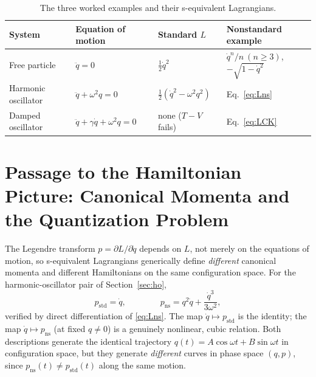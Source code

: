 \documentclass[11pt]{article}
\theoremstyle{remark}
\begin{document}
\begin{table}[h]
\centering
\renewcommand{\arraystretch}{1.4}
\begin{tabular}{l l l l}
\hline
System & Equation of motion & Standard $L$ & Nonstandard example \\
\hline
Free particle & $\ddot q=0$ & $\tfrac12\dot q^2$ & $\dot q^n/n\ (n\geq 3)$, $-\sqrt{1-\dot q^2}$ \\
Harmonic oscillator & $\ddot q+\omega^2 q=0$ & $\tfrac12(\dot q^2-\omega^2 q^2)$ & Eq.~\eqref{eq:Lns} \\
Damped oscillator & $\ddot q+\gamma\dot q+\omega^2 q=0$ & none ($T{-}V$ fails) & Eq.~\eqref{eq:LCK} \\
\hline
\end{tabular}
\caption{The three worked examples and their s-equivalent Lagrangians.}
\label{tab:summary}
\end{table}

\section{Passage to the Hamiltonian Picture: Canonical Momenta and the Quantization Problem}

The Legendre transform $p=\partial L/\partial \dot q$ depends on $L$, not merely on the equations of motion, so s-equivalent Lagrangians generically define \emph{different} canonical momenta and different Hamiltonians on the same configuration space. For the harmonic-oscillator pair of Section~\ref{sec:ho},
\begin{equation}
p_{\mathrm{std}} = \dot q, \qquad\qquad p_{\mathrm{ns}} = q^2\dot q+\frac{\dot q^3}{3\omega^2},
\end{equation}
verified by direct differentiation of \eqref{eq:Lns}. The map $\dot q\mapsto p_{\mathrm{std}}$ is the identity; the map $\dot q\mapsto p_{\mathrm{ns}}$ (at fixed $q\neq0$) is a genuinely nonlinear, cubic relation. Both descriptions generate the identical trajectory $q(t)=A\cos\omega t+B\sin\omega t$ in configuration space, but they generate \emph{different} curves in phase space $(q,p)$, since $p_{\mathrm{ns}}(t)\neq p_{\mathrm{std}}(t)$ along the same motion.
\end{document}
